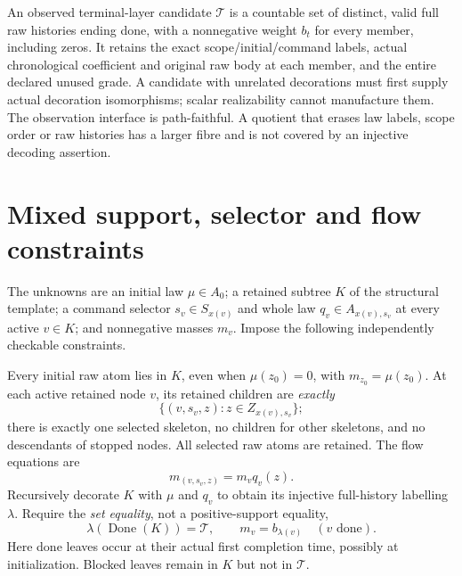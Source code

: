 \documentclass[11pt]{article}
\begin{document}
An observed terminal-layer candidate $\mathcal T$ is a countable set of distinct, valid full raw histories ending done, with a nonnegative weight $b_t$ for every member, including zeros. It retains the exact scope/initial/command labels, actual chronological coefficient and original raw body at each member, and the entire declared unused grade. A candidate with unrelated decorations must first supply actual decoration isomorphisms; scalar realizability cannot manufacture them. The observation interface is path-faithful. A quotient that erases law labels, scope order or raw histories has a larger fibre and is not covered by an injective decoding assertion.

\section{Mixed support, selector and flow constraints}
The unknowns are an initial law $\mu\in A_0$; a retained subtree $K$ of the structural template; a command selector $s_v\in S_{x(v)}$ and whole law $q_v\in A_{x(v),s_v}$ at every active $v\in K$; and nonnegative masses $m_v$. Impose the following independently checkable constraints.

Every initial raw atom lies in $K$, even when $\mu(z_0)=0$, with $m_{z_0}=\mu(z_0)$. At each active retained node $v$, its retained children are \emph{exactly}
\[
             \{(v,s_v,z):z\in Z_{x(v),s_v}\};             \tag{2}
\]
there is exactly one selected skeleton, no children for other skeletons, and no descendants of stopped nodes. All selected raw atoms are retained. The flow equations are
\[
           m_{(v,s_v,z)}=m_v q_v(z).                     \tag{3}
\]
Recursively decorate $K$ with $\mu$ and $q_v$ to obtain its injective full-history labelling $\lambda$. Require the \emph{set equality}, not a positive-support equality,
\[
       \lambda(\operatorname{Done}(K))=\mathcal T,
       \qquad m_v=b_{\lambda(v)}\quad(v\text{ done}).  \tag{4}
\]
Here done leaves occur at their actual first completion time, possibly at initialization. Blocked leaves remain in $K$ but not in $\mathcal T$.
\end{document}
